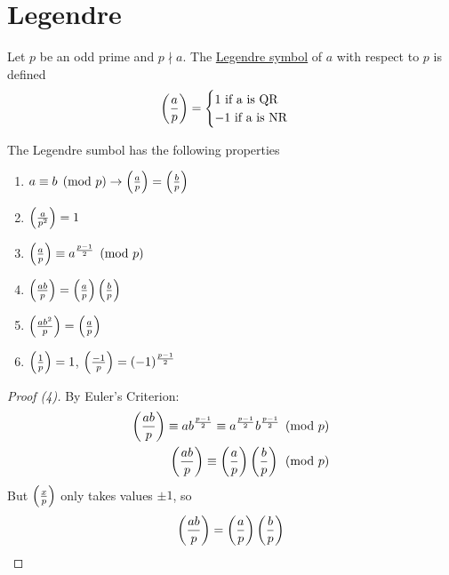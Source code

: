 \section{Legendre}
    \begin{definition}
        Let $p$ be an odd prime and $p\nmid a$. The \underline{Legendre symbol}
        of $a$ with respect to $p$ is defined 
        \[
            \left( \frac{a}{p} \right)  = 
            \begin{cases}
                1 \text{ if a is QR} \\
                -1 \text{ if a is NR} 
            \end{cases}
        \]
    \end{definition}
    \begin{theorem}
        The Legendre sumbol has the following properties
        \begin{enumerate}
            \item $a\equiv b\pmod{p} \rightarrow \left( \frac{a}{p} \right)  = \left( \frac{b}{p} \right) $
            \item $\left( \frac{a}{p^2} \right)  = 1$
            \item $\left( \frac{a}{p} \right) \equiv a^{\frac{p-1}{2}}\pmod{p}$
            \item $\left( \frac{ab}{p} \right)  = \left( \frac{a}{p} \right) \left( \frac{b}{p} \right) $
            \item $\left( \frac{ab^2}{p} \right)  = \left( \frac{a}{p} \right) $
            \item $\left( \frac{1}{p} \right)  = 1$, $\left( \frac{-1}{p} \right)  = (-1)^{\frac{p-1}{2}}$
        \end{enumerate}
        \begin{proof} [Proof (4)]
            By Euler's Criterion: 
            \begin{align*}
                \left( \frac{ab}{p} \right) \equiv ab^{\frac{p-1}{2}}\equiv a^{\frac{p-1}{2}}b^{\frac{p-1}{2}}\pmod{p} \\
                \left( \frac{ab}{p} \right) \equiv \left( \frac{a}{p} \right) \left( \frac{b}{p} \right) \pmod{p}
            \end{align*}
            But $\left( \frac{x}{p} \right) $ only takes values $\pm 1$, so 
            \[
                \left( \frac{ab}{p} \right)  = \left( \frac{a}{p} \right) \left( \frac{b}{p} \right) 
            \]
        \end{proof}
    \end{theorem}
